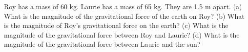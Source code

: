  Roy has a mass of 60 kg. Laurie has a mass of 65 kg.
They are 1.5 m apart.\hwendpart
(a) What is the magnitude of the gravitational force
of the earth on Roy?\hwendpart
(b) What is the magnitude of Roy's gravitational force on the earth?\hwendpart
(c) What is the magnitude of the gravitational force
between Roy and Laurie?\hwendpart
(d) What is the magnitude of the gravitational force
between Laurie and the sun?\answercheck
